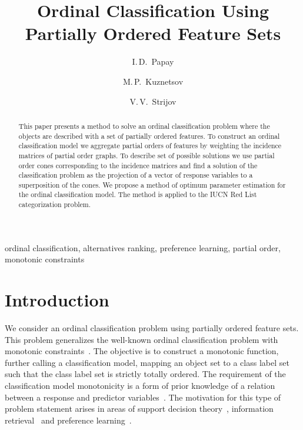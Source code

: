 \documentclass[12pt,preprint]{elsarticle}
\begin{document}
\title{Ordinal Classification Using Partially Ordered Feature Sets}

\author[mipt]{I.\,D.~Papay}
\author[mipt]{M.\,P.~Kuznetsov}
\author[mipt,ccas]{V.\,V.~Strijov}
\address[mipt]{Moscow Institute of Physics and Technology, Institutskiy lane 9, Dolgoprudny city, Moscow region, 141700, Russia}
\address[ccas]{Dorodnicyn Computing Center of Russian Academy of Sciences,  Vavilov st. 40, 119333 Moscow, Russia}

\begin{abstract}
This paper presents a method to solve an ordinal classification problem where the objects are described with a set of partially ordered features.
To construct an ordinal classification model we aggregate partial orders of features by weighting the incidence matrices of partial order graphs. To describe set of possible solutions we use partial order cones corresponding to the incidence matrices and find a solution of the classification problem as the projection of a vector of response variables to a superposition of the cones. We propose a method of optimum parameter estimation for the ordinal classification model. The method is applied to the IUCN Red List categorization problem.
\end{abstract}

\begin{keyword}
ordinal classification, alternatives ranking, preference learning, partial order, monotonic constraints
\end{keyword}

\maketitle

\section{Introduction}
We consider an ordinal classification problem using partially ordered feature sets. This problem generalizes the well-known ordinal classification problem with monotonic constraints~\cite{Kotlowski2013, Corrente2013, Ali2020}. The objective is to construct a monotonic function, further calling a classification model, mapping an object set to a class label set such that the class label set is strictly totally ordered. The requirement of the classification model monotonicity is a form of prior knowledge of a relation between a response and predictor variables~\cite{raey, Jorge2024, Eduardo2022}. The motivation for this type of problem statement arises in areas of support decision theory~\cite{Enrique2023,Ameed2022,Yossi2022}, information retrieval~\cite{Schafer2007,Trotman2005,Spirin2011} and preference learning~\cite{Fuernkranz2011, Bofei2024}.
\end{document}
